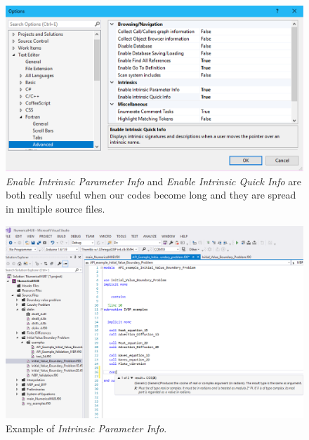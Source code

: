 \begin{enumerate}
	\begin{figure}
		\centering
		\includegraphics[width=  \textwidth]{Figures/Commands4}
		\caption{\textit{Enable Intrinsic Parameter Info} and \textit{Enable Intrinsic Quick Info} are both really useful when our codes become long and they are spread in multiple source files.}
		\label{fig:Commands4}
	\end{figure}
	
	\begin{figure}
		\centering
		\includegraphics[width= \textwidth]{Figures/Commands5}
		\caption{Example of \textit{Intrinsic Parameter Info}.}
		\label{fig:Commands5}
	\end{figure}
	

\end{enumerate}
